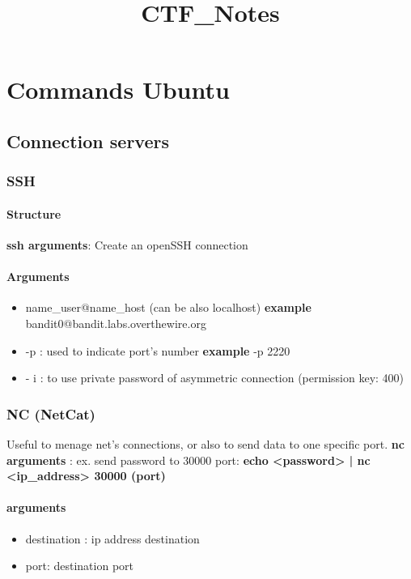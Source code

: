 \documentclass{article}
\title{CTF_Notes}
\begin{document}
\tableofcontents



\section{Commands Ubuntu}
    \subsection{Connection servers}
                \subsubsection{SSH}
                    \paragraph{Structure}
                    \textbf{ssh arguments}: Create an openSSH connection
                        \paragraph{Arguments}
                            \begin{itemize}
                                \item name_user@name_host (can be also localhost) \textbf{example} bandit0@bandit.labs.overthewire.org
                                \item  -p : used to indicate port's number \textbf{example} -p 2220 
                                \item - i : to use private password of asymmetric connection (permission key: 400)
                            \end{itemize}
                \subsubsection{NC (NetCat)}
                            Useful to menage net's connections, or also to send data to one specific port.
                            \textbf{nc arguments} : ex. send password to 30000 port: \textbf{echo <password> | nc <ip_address> 30000 (port)}
                            \paragraph{arguments}
                            \begin{itemize}
                                \item destination : ip address destination
                                \item port: destination port
                            \end{itemize}
\end{document}
